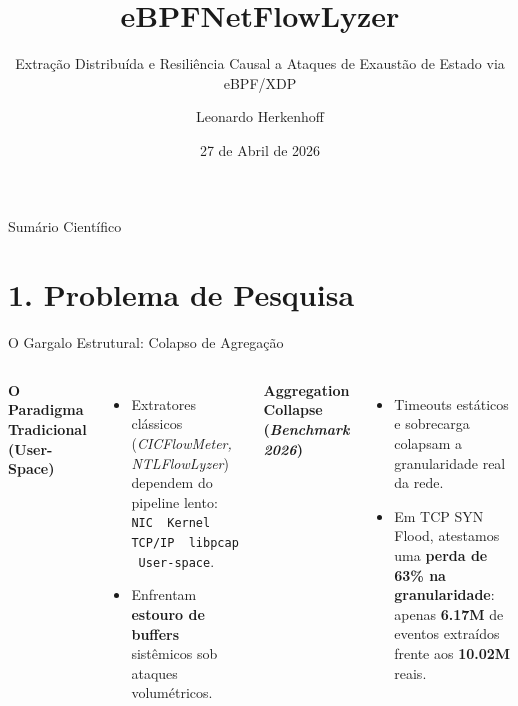 \documentclass[aspectratio=169, 10pt]{beamer}
\title{\textbf{eBPFNetFlowLyzer}}
\subtitle{Extração Distribuída e Resiliência Causal a Ataques de Exaustão de Estado via eBPF/XDP}
\author{Leonardo Herkenhoff}
\date{27 de Abril de 2026}
\institute{Mestrado em Ciência da Computação}
\begin{document}
\maketitle

\begin{frame}{Sumário Científico}
  \tableofcontents[hideallsubsections]
\end{frame}

\section{1. Problema de Pesquisa}

\begin{frame}{O Gargalo Estrutural: Colapso de Agregação}
  \begin{columns}[T]
      \textbf{\color{PrimaryDark} O Paradigma Tradicional (User-Space)}
      \vspace{0.4em}
      \begin{itemize}
        \item Extratores clássicos (\textit{CICFlowMeter, NTLFlowLyzer}) dependem do pipeline lento: \texttt{NIC \textrightarrow\ Kernel TCP/IP \textrightarrow\ libpcap \textrightarrow\ User-space}.
        \item Enfrentam \textbf{estouro de buffers} sistêmicos sob ataques volumétricos.
      \end{itemize}
      
      \vspace{0.8em}
      \textbf{\color{SecondaryAccent} Aggregation Collapse (\textit{Benchmark 2026})}
      \begin{itemize}
        \item Timeouts estáticos e sobrecarga colapsam a granularidade real da rede.
        \item Em TCP SYN Flood, atestamos uma \textbf{perda de 63\% na granularidade}: apenas \textbf{6.17M} de eventos extraídos frente aos \textbf{10.02M} reais.
      \end{itemize}

  \end{columns}
\end{frame}
\end{document}
